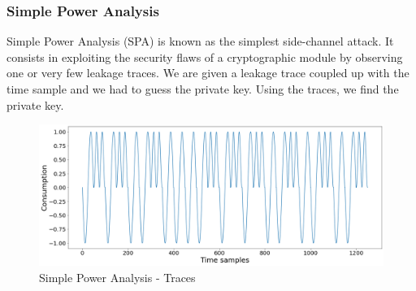 \documentclass[runningheads]{llncs}
\begin{document}
\subsubsection{Simple Power Analysis}
Simple Power Analysis (SPA) is known as the simplest side-channel attack. It consists in exploiting the security flaws of a cryptographic module by observing one or very few leakage traces.
We are given a leakage trace coupled up with the time sample and we had to guess the private key. Using the traces, we find the private key.

\begin{figure}
    \includegraphics[width=\textwidth]{images/SPA.png}
    \caption{Simple Power Analysis - Traces} \label{fig6}
\end{figure}
\end{document}
